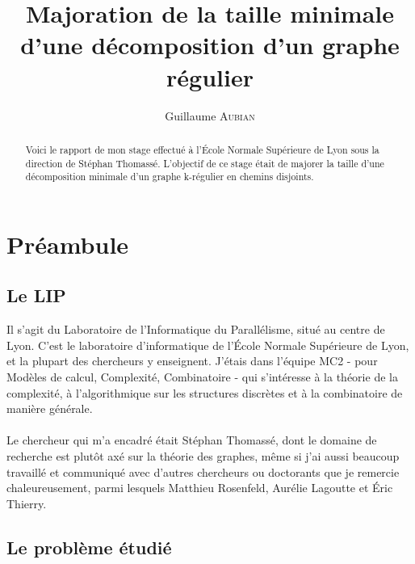 \documentclass[a4paper]{article}
\title{Majoration de la taille minimale d'une décomposition d'un graphe régulier}
\author{Guillaume \textsc{Aubian}}
\theoremstyle{definition}
\theoremstyle{remark}
\begin{document}
\maketitle



\begin{abstract}
Voici le rapport de mon stage effectué à l'École Normale Supérieure de Lyon sous la direction de
Stéphan Thomassé. L'objectif de ce stage était de majorer la taille
d'une décomposition minimale d'un graphe k-régulier en chemins disjoints.
\end{abstract}

\tableofcontents

\newpage

\section{Préambule}

\paragraph{}

\subsection{Le LIP}
Il s'agit du Laboratoire de l'Informatique du Parallélisme, situé au centre de Lyon. C'est le laboratoire d'informatique de l'École Normale 
Supérieure de Lyon, et la plupart des chercheurs y enseignent. J'étais dans l'équipe MC2 - pour Modèles de calcul, Complexité, Combinatoire -
qui s'intéresse à la théorie de la complexité, à 
l'algorithmique sur les structures discrètes et à la combinatoire de 
manière générale.


\paragraph{}
Le chercheur qui m'a encadré était Stéphan Thomassé, dont le domaine
de recherche est plutôt axé sur la théorie des graphes, même si j'ai 
aussi beaucoup travaillé et communiqué avec d'autres chercheurs ou doctorants 
que je remercie chaleureusement, parmi lesquels Matthieu Rosenfeld, Aurélie Lagoutte et Éric Thierry.


\subsection{Le problème étudié}
\end{document}
